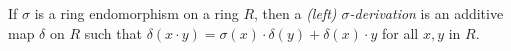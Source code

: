 \documentclass[12pt]{article}
\begin{document}
If $\sigma$ is a ring endomorphism on a ring $R$, 
then a {\it (left) $\sigma$-derivation}
is an additive map $\delta$ on $R$ such that 
$\delta(x \cdot y)=\sigma(x) \cdot \delta(y) + \delta(x) \cdot y$
for all $x,y$ in $R$.
\end{document}
